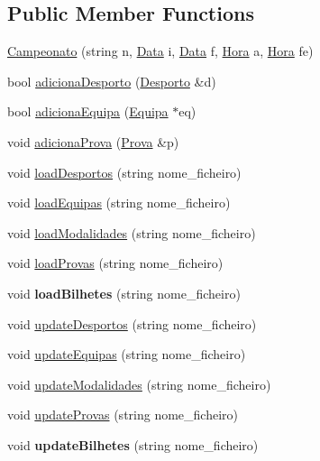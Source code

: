 \subsection*{Public Member Functions}
\begin{DoxyCompactItemize}
\item 
\hyperlink{class_campeonato_a1768952d93666c042f3548b1dd88969d}{Campeonato} (string n, \hyperlink{class_data}{Data} i, \hyperlink{class_data}{Data} f, \hyperlink{class_hora}{Hora} a, \hyperlink{class_hora}{Hora} fe)
\item 
bool \hyperlink{class_campeonato_ad1a75cefd258565c214586fab9ee06e5}{adiciona\+Desporto} (\hyperlink{class_desporto}{Desporto} \&d)
\item 
bool \hyperlink{class_campeonato_aa3baf829c6cfb588d10aa34b9bbf5127}{adiciona\+Equipa} (\hyperlink{class_equipa}{Equipa} $\ast$eq)
\item 
void \hyperlink{class_campeonato_ab965c85d2c86ec7e871b8ff3a179c8f2}{adiciona\+Prova} (\hyperlink{class_prova}{Prova} \&p)
\item 
void \hyperlink{class_campeonato_a6f608bec193eeb23617361e4fa389fc3}{load\+Desportos} (string nome\+\_\+ficheiro)
\item 
void \hyperlink{class_campeonato_ad6619dd60033e23a3f6d813e1d479b7b}{load\+Equipas} (string nome\+\_\+ficheiro)
\item 
void \hyperlink{class_campeonato_a54a2450f065240ac1e13483f3f4655a9}{load\+Modalidades} (string nome\+\_\+ficheiro)
\item 
void \hyperlink{class_campeonato_a9aaac1a7b097980e12c1436969b087fc}{load\+Provas} (string nome\+\_\+ficheiro)
\item 
\hypertarget{class_campeonato_aa5689f53d7552ffb5fabb8d43181e5aa}{}void {\bfseries load\+Bilhetes} (string nome\+\_\+ficheiro)\label{class_campeonato_aa5689f53d7552ffb5fabb8d43181e5aa}

\item 
void \hyperlink{class_campeonato_a788cad8d5826398c4c7d32fb69503799}{update\+Desportos} (string nome\+\_\+ficheiro)
\item 
void \hyperlink{class_campeonato_a83cadf1caa248b964b340e9f630b09b2}{update\+Equipas} (string nome\+\_\+ficheiro)
\item 
void \hyperlink{class_campeonato_a522ea131df67ed791de4f6750746b806}{update\+Modalidades} (string nome\+\_\+ficheiro)
\item 
void \hyperlink{class_campeonato_a29e52272fd3274a0f6dc1047e7417064}{update\+Provas} (string nome\+\_\+ficheiro)
\item 
\hypertarget{class_campeonato_a0a6b7931482007a24eb0f7af5c8f42a1}{}void {\bfseries update\+Bilhetes} (string nome\+\_\+ficheiro)\label{class_campeonato_a0a6b7931482007a24eb0f7af5c8f42a1}


\end{DoxyCompactItemize}

